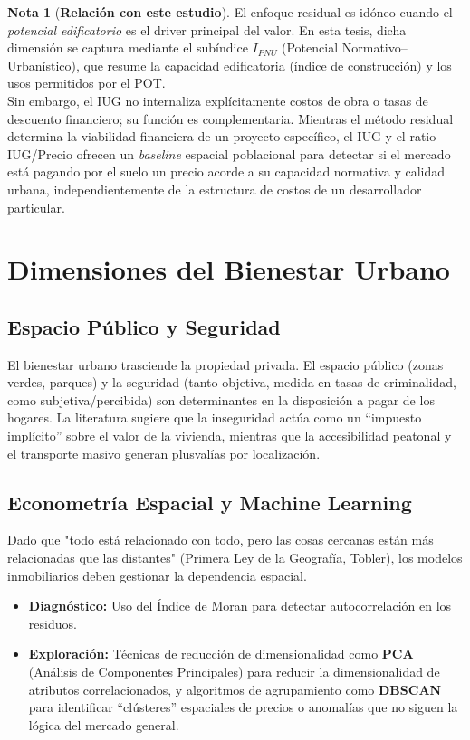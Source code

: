\documentclass[12pt, a4paper, twoside, openright]{report}
\theoremstyle{plain}
\theoremstyle{definition}
\newtheorem{remark}{Nota}
\newcommand{\IUG}{IUG}             %
\begin{document}
\begin{remark}[\textbf{Relación con este estudio}]
El enfoque residual es idóneo cuando el \emph{potencial edificatorio} es el driver principal del valor. En esta tesis, dicha dimensión se captura mediante el subíndice $I_{PNU}$ (Potencial Normativo–Urbanístico), que resume la capacidad edificatoria (índice de construcción) y los usos permitidos por el POT.
\\
Sin embargo, el \IUG{} no internaliza explícitamente costos de obra o tasas de descuento financiero; su función es complementaria. Mientras el método residual determina la viabilidad financiera de un proyecto específico, el \IUG{} y el ratio IUG/Precio ofrecen un \emph{baseline} espacial poblacional para detectar si el mercado está pagando por el suelo un precio acorde a su capacidad normativa y calidad urbana, independientemente de la estructura de costos de un desarrollador particular.
\end{remark}

\section{Dimensiones del Bienestar Urbano}

\subsection{Espacio Público y Seguridad}
El bienestar urbano trasciende la propiedad privada. El espacio público (zonas verdes, parques) y la seguridad (tanto objetiva, medida en tasas de criminalidad, como subjetiva/percibida) son determinantes en la disposición a pagar de los hogares. La literatura sugiere que la inseguridad actúa como un ``impuesto implícito'' sobre el valor de la vivienda, mientras que la accesibilidad peatonal y el transporte masivo generan plusvalías por localización.

\subsection{Econometría Espacial y Machine Learning}
Dado que "todo está relacionado con todo, pero las cosas cercanas están más relacionadas que las distantes" (Primera Ley de la Geografía, Tobler), los modelos inmobiliarios deben gestionar la dependencia espacial.
\begin{itemize}
    \item \textbf{Diagnóstico:} Uso del Índice de Moran para detectar autocorrelación en los residuos.
    \item \textbf{Exploración:} Técnicas de reducción de dimensionalidad como \textbf{PCA} (Análisis de Componentes Principales) para reducir la dimensionalidad de atributos correlacionados, y algoritmos de agrupamiento como \textbf{DBSCAN} para identificar ``clústeres'' espaciales de precios o anomalías que no siguen la lógica del mercado general.
\end{itemize}
\end{document}
